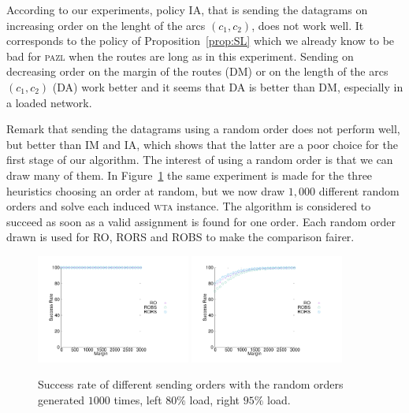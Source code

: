 \documentclass[a4paper,10pt]{article}
\newcommand\pazl{\textsc{pazl}\xspace}
\newcommand\wta{\textsc{wta}\xspace}
\begin{document}
          
     According to our experiments, policy IA, that is sending the datagrams on increasing order on the lenght of the arcs $(c_1,c_2)$, does not work well. It corresponds to the policy of Proposition~\ref{prop:SL} which we already know to be bad for \pazl when the routes are long as in this experiment. Sending on decreasing order on the margin of the routes (DM) or on the length of the arcs $(c_1,c_2)$ (DA) work better and it seems that DA is better than DM, especially in a loaded network. 
     
     Remark that sending the datagrams using a random order does not perform well,
     but better than IM and IA, which shows that the latter are a poor choice for the first stage of our algorithm. The interest of using a random order is that we can draw many of them. In Figure~\ref{fig:success1000random} the same experiment is made for the three heuristics choosing an order at random, but we now draw $1,000$ different random orders and solve each induced \wta instance. The algorithm is considered to succeed as soon as a valid assignment is found for one order. Each random order drawn is used for RO, RORS and ROBS to make the comparison fairer.
 
\begin{figure}[h] 
  \centering
  \includegraphics[width=0.45\textwidth]{departs_gp_25000.pdf}
    \includegraphics[width=0.45\textwidth]{departs_gp_21000.pdf}
    
       \caption{Success rate of different sending orders with the random orders generated $1000$ times, left $80\%$ load, right $95\%$ load.}
      \label{fig:success1000random}
          \end{figure}
\end{document}

